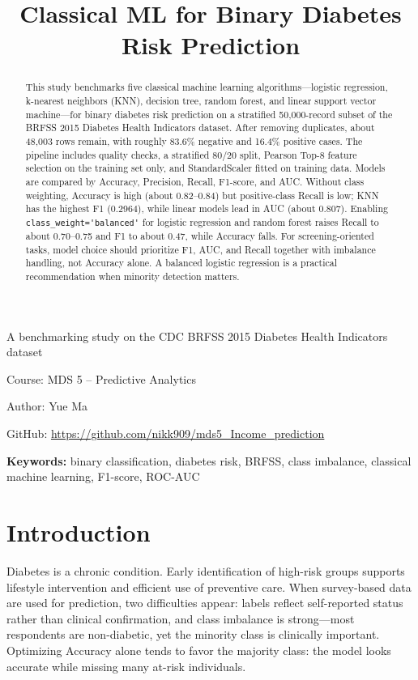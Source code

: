 \documentclass[11pt,a4paper]{article}
\makeatletter
\renewcommand{\normalsize}{\fontsize{11}{22}\selectfont}
\providecommand{\keywords}[1]{%
  \par\vspace{0.5\baselineskip}%
  \noindent\textbf{Keywords:} #1\par
}
\newcommand{\courseauthor}[1]{\def\@courseauthor{#1}}
\newcommand{\courseaffil}[1]{\def\@courseaffil{#1}}
\newcommand{\coursesubtitle}[1]{\def\@coursesubtitle{#1}}
\newcommand{\coursegithub}[1]{\def\@coursegithub{#1}}
\newcommand{\makecoursetitle}{%
  \thispagestyle{empty}%
  \begin{center}
    {\Large\bfseries \@title\par}
    \vspace{1.0\baselineskip}
    {\large \@coursesubtitle\par}
    \vspace{1.5\baselineskip}
    {\normalsize Course: \@courseaffil\par}
    \vspace{0.75\baselineskip}
    {\normalsize Author: \@courseauthor\par}
    \vspace{0.75\baselineskip}
    {\normalsize GitHub: \expandafter\url\expandafter{\@coursegithub}\par}
  \end{center}
  \vspace{1.0\baselineskip}
}
\makeatother
\begin{document}
\title{Classical ML for Binary Diabetes Risk Prediction}
\coursesubtitle{A benchmarking study on the CDC BRFSS 2015 Diabetes Health Indicators dataset}
\courseaffil{MDS 5 -- Predictive Analytics}
\courseauthor{Yue Ma}
\coursegithub{https://github.com/nikk909/mds5_Income_prediction}

\makecoursetitle

\begin{abstract}
\noindent
This study benchmarks five classical machine learning algorithms---logistic regression, k-nearest neighbors (KNN), decision tree, random forest, and linear support vector machine---for binary diabetes risk prediction on a stratified 50,000-record subset of the BRFSS 2015 Diabetes Health Indicators dataset. After removing duplicates, about 48,003 rows remain, with roughly 83.6\% negative and 16.4\% positive cases. The pipeline includes quality checks, a stratified 80/20 split, Pearson Top-8 feature selection on the training set only, and StandardScaler fitted on training data. Models are compared by Accuracy, Precision, Recall, F1-score, and AUC. Without class weighting, Accuracy is high (about 0.82--0.84) but positive-class Recall is low; KNN has the highest F1 (0.2964), while linear models lead in AUC (about 0.807). Enabling \lstinline{class_weight='balanced'} for logistic regression and random forest raises Recall to about 0.70--0.75 and F1 to about 0.47, while Accuracy falls. For screening-oriented tasks, model choice should prioritize F1, AUC, and Recall together with imbalance handling, not Accuracy alone. A balanced logistic regression is a practical recommendation when minority detection matters.
\end{abstract}

\keywords{binary classification, diabetes risk, BRFSS, class imbalance, classical machine learning, F1-score, ROC-AUC}

\clearpage
\pagestyle{fancy}

\section{Introduction}\label{sec:intro}

Diabetes is a chronic condition. Early identification of high-risk groups supports lifestyle intervention and efficient use of preventive care. When survey-based data are used for prediction, two difficulties appear: labels reflect self-reported status rather than clinical confirmation, and class imbalance is strong---most respondents are non-diabetic, yet the minority class is clinically important. Optimizing Accuracy alone tends to favor the majority class: the model looks accurate while missing many at-risk individuals.
\end{document}
